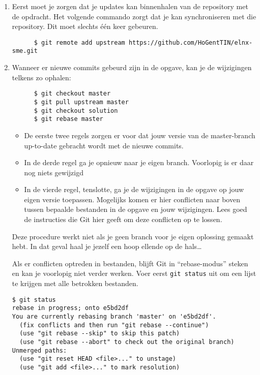 \begin{enumerate}
  \item Eerst moet je zorgen dat je updates kan binnenhalen van de repository met de opdracht. Het volgende commando zorgt dat je kan synchroniseren met die repository. Dit moet slechts één keer gebeuren.

    \begin{verbatim}
      $ git remote add upstream https://github.com/HoGentTIN/elnx-sme.git
    \end{verbatim}

  \item Wanneer er nieuwe commits gebeurd zijn in de opgave, kan je de wijzigingen telkens zo ophalen:

    \begin{verbatim}
      $ git checkout master
      $ git pull upstream master
      $ git checkout solution
      $ git rebase master
    \end{verbatim}

    \begin{itemize}
      \item De eerste twee regels zorgen er voor dat jouw versie van de master-branch up-to-date gebracht wordt met de nieuwe commits.
      \item In de derde regel ga je opnieuw naar je eigen branch. Voorlopig is er daar nog niets gewijzigd
      \item In de vierde regel, tenslotte, ga je de wijzigingen in de opgave op jouw eigen versie toepassen. Mogelijks komen er hier conflicten naar boven tussen bepaalde bestanden in de opgave en jouw wijzigingen. Lees goed de instructies die Git hier geeft om deze conflicten op te lossen.
    \end{itemize}

Deze procedure werkt niet als je geen branch voor je eigen oplossing gemaakt hebt. In dat geval haal je jezelf een hoop ellende op de hals\ldots

Als er conflicten optreden in bestanden, blijft Git in ``rebase-modus'' steken en kan je voorlopig niet verder werken. Voer eerst \texttt{git status} uit om een lijst te krijgen met alle betrokken bestanden.

\begin{verbatim}
$ git status
rebase in progress; onto e5bd2df
You are currently rebasing branch 'master' on 'e5bd2df'.
  (fix conflicts and then run "git rebase --continue")
  (use "git rebase --skip" to skip this patch)
  (use "git rebase --abort" to check out the original branch)
Unmerged paths:
  (use "git reset HEAD <file>..." to unstage)
  (use "git add <file>..." to mark resolution)


\end{verbatim}
\end{enumerate}
